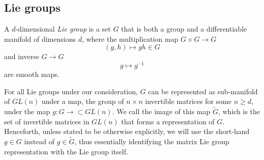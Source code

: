 \subsection{Lie groups}

\begin{definition}
A $d$-dimensional \textit{Lie group} is a set $G$ that is both a group and a differentiable manifold of dimensions $d$, where the multiplication map $G\times G \to G$
\begin{equation}
(g,h) \mapsto gh \in G
\end{equation}
and inverse $G \to G$
\begin{equation}
g \mapsto g^{-1}
\end{equation}
are smooth maps.
\end{definition}

For all Lie groups under our consideration, $G$ can be represented as sub-manifold of $GL(n)$ under a map, the group of $n\times n$ invertible matrices for some $n \geq d$, under the map $g : G \to \subset GL(n)$. We call the image of this map $\tilde{G}$, which is the set of invertible matrices in $GL(n)$ that forms a representation of $G$. Henceforth, unless stated to be otherwise explicitly, we will use the short-hand $g \in G$ instead of $g \in \tilde{G}$, thus essentially identifying the matrix Lie group representation with the Lie group itself.

